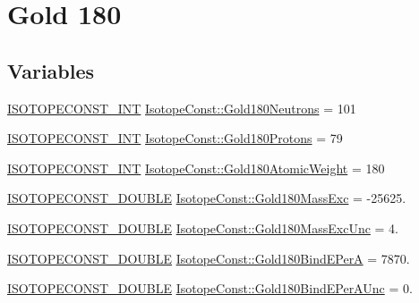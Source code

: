 \hypertarget{group___isotope_const-_gold-_au180}{}\section{Gold 180}
\label{group___isotope_const-_gold-_au180}
\subsection*{Variables}
\begin{DoxyCompactItemize}
\item 
\mbox{\hyperlink{group___isotope_const-_macros_ga5f18360b3e99483a35c32d789e62621c}{I\+S\+O\+T\+O\+P\+E\+C\+O\+N\+S\+T\+\_\+\+I\+NT}} \mbox{\hyperlink{group___isotope_const-_gold-_au180_gac6373d58975fd8445e00fe9d47a329a7}{Isotope\+Const\+::\+Gold180\+Neutrons}} = 101
\item 
\mbox{\hyperlink{group___isotope_const-_macros_ga5f18360b3e99483a35c32d789e62621c}{I\+S\+O\+T\+O\+P\+E\+C\+O\+N\+S\+T\+\_\+\+I\+NT}} \mbox{\hyperlink{group___isotope_const-_gold-_au180_ga32c382cd87ec8e7c8225d2fb07df24ab}{Isotope\+Const\+::\+Gold180\+Protons}} = 79
\item 
\mbox{\hyperlink{group___isotope_const-_macros_ga5f18360b3e99483a35c32d789e62621c}{I\+S\+O\+T\+O\+P\+E\+C\+O\+N\+S\+T\+\_\+\+I\+NT}} \mbox{\hyperlink{group___isotope_const-_gold-_au180_ga9884a562d24b05070f73614c623246dd}{Isotope\+Const\+::\+Gold180\+Atomic\+Weight}} = 180
\item 
\mbox{\hyperlink{group___isotope_const-_macros_ga8f45a7272ce02c0b4c65c44636ed719a}{I\+S\+O\+T\+O\+P\+E\+C\+O\+N\+S\+T\+\_\+\+D\+O\+U\+B\+LE}} \mbox{\hyperlink{group___isotope_const-_gold-_au180_gac93a89aab82e2ddeb1f7883011a1e968}{Isotope\+Const\+::\+Gold180\+Mass\+Exc}} = -\/25625.
\item 
\mbox{\hyperlink{group___isotope_const-_macros_ga8f45a7272ce02c0b4c65c44636ed719a}{I\+S\+O\+T\+O\+P\+E\+C\+O\+N\+S\+T\+\_\+\+D\+O\+U\+B\+LE}} \mbox{\hyperlink{group___isotope_const-_gold-_au180_gad275b82ba2dd6ba87cdc403fe263988c}{Isotope\+Const\+::\+Gold180\+Mass\+Exc\+Unc}} = 4.
\item 
\mbox{\hyperlink{group___isotope_const-_macros_ga8f45a7272ce02c0b4c65c44636ed719a}{I\+S\+O\+T\+O\+P\+E\+C\+O\+N\+S\+T\+\_\+\+D\+O\+U\+B\+LE}} \mbox{\hyperlink{group___isotope_const-_gold-_au180_ga53ebf3485554df83f775957458ba0c6d}{Isotope\+Const\+::\+Gold180\+Bind\+E\+PerA}} = 7870.
\item 
\mbox{\hyperlink{group___isotope_const-_macros_ga8f45a7272ce02c0b4c65c44636ed719a}{I\+S\+O\+T\+O\+P\+E\+C\+O\+N\+S\+T\+\_\+\+D\+O\+U\+B\+LE}} \mbox{\hyperlink{group___isotope_const-_gold-_au180_ga6711fe8865dbfbdf02ed27803ad357d3}{Isotope\+Const\+::\+Gold180\+Bind\+E\+Per\+A\+Unc}} = 0.

\end{DoxyCompactItemize}
